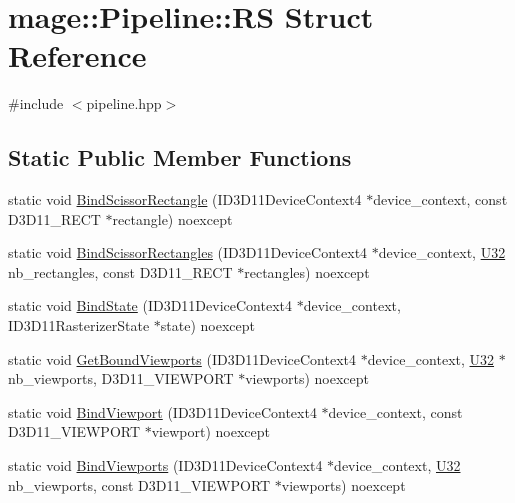 \hypertarget{structmage_1_1_pipeline_1_1_r_s}{}\section{mage\+:\+:Pipeline\+:\+:RS Struct Reference}
\label{structmage_1_1_pipeline_1_1_r_s}


{\ttfamily \#include $<$pipeline.\+hpp$>$}

\subsection*{Static Public Member Functions}
\begin{DoxyCompactItemize}
\item 
static void \hyperlink{structmage_1_1_pipeline_1_1_r_s_a2752b80ae52f33dae7c42b48b4481ec9}{Bind\+Scissor\+Rectangle} (I\+D3\+D11\+Device\+Context4 $\ast$device\+\_\+context, const D3\+D11\+\_\+\+R\+E\+CT $\ast$rectangle) noexcept
\item 
static void \hyperlink{structmage_1_1_pipeline_1_1_r_s_a11ee6c76dd0c05eecc0f09df7dc61068}{Bind\+Scissor\+Rectangles} (I\+D3\+D11\+Device\+Context4 $\ast$device\+\_\+context, \hyperlink{namespacemage_a41c104c036fba3756a74e19f793eeaa1}{U32} nb\+\_\+rectangles, const D3\+D11\+\_\+\+R\+E\+CT $\ast$rectangles) noexcept
\item 
static void \hyperlink{structmage_1_1_pipeline_1_1_r_s_a247899ff60b64d61f240b89312904c91}{Bind\+State} (I\+D3\+D11\+Device\+Context4 $\ast$device\+\_\+context, I\+D3\+D11\+Rasterizer\+State $\ast$state) noexcept
\item 
static void \hyperlink{structmage_1_1_pipeline_1_1_r_s_ab807c959aa17ed7db5b7158502551da0}{Get\+Bound\+Viewports} (I\+D3\+D11\+Device\+Context4 $\ast$device\+\_\+context, \hyperlink{namespacemage_a41c104c036fba3756a74e19f793eeaa1}{U32} $\ast$nb\+\_\+viewports, D3\+D11\+\_\+\+V\+I\+E\+W\+P\+O\+RT $\ast$viewports) noexcept
\item 
static void \hyperlink{structmage_1_1_pipeline_1_1_r_s_aacab4adaa1314bd95fb6197fbfa728a9}{Bind\+Viewport} (I\+D3\+D11\+Device\+Context4 $\ast$device\+\_\+context, const D3\+D11\+\_\+\+V\+I\+E\+W\+P\+O\+RT $\ast$viewport) noexcept
\item 
static void \hyperlink{structmage_1_1_pipeline_1_1_r_s_ab3bc6bbb80b4e74a07a9c041253adbf9}{Bind\+Viewports} (I\+D3\+D11\+Device\+Context4 $\ast$device\+\_\+context, \hyperlink{namespacemage_a41c104c036fba3756a74e19f793eeaa1}{U32} nb\+\_\+viewports, const D3\+D11\+\_\+\+V\+I\+E\+W\+P\+O\+RT $\ast$viewports) noexcept
\end{DoxyCompactItemize}


